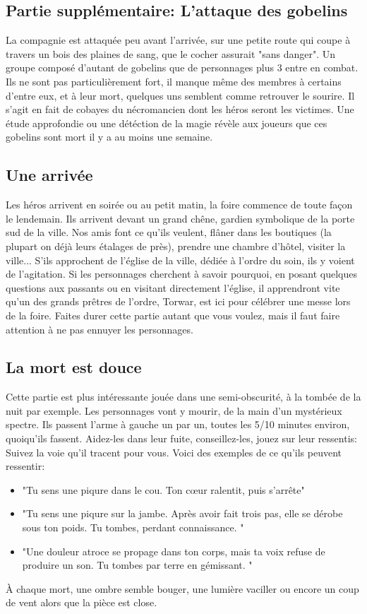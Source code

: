 \documentclass[a4paper]{article}
\begin{document}
\subsection{Partie supplémentaire: L'attaque des gobelins} 
La compagnie est attaquée peu avant l'arrivée, sur une petite route qui coupe à travers un bois des plaines de sang, que le cocher assurait "sans danger". Un groupe composé d'autant de gobelins que de personnages plus 3 entre en combat. Ils ne sont pas particulièrement fort, il manque même des membres à certains d'entre eux, et à leur mort, quelques uns semblent comme retrouver le sourire. Il s'agit en fait de cobayes du nécromancien dont les héros seront les victimes. Une étude approfondie ou une détéction de la magie révèle aux joueurs que ces gobelins sont mort il y a au moins une semaine.

\subsection{Une arrivée}
Les héros arrivent en soirée ou au petit matin, la foire commence de toute façon le lendemain. Ils arrivent devant un grand chêne, gardien symbolique de la porte sud de la ville. Nos amis font ce qu'ils veulent, flâner dans les boutiques (la plupart on déjà leurs étalages de près), prendre une chambre d'hôtel, visiter la ville... S'ils approchent de l'église de la ville, dédiée à l'ordre du soin, ils y voient de l'agitation. Si les personnages cherchent à savoir pourquoi, en posant quelques questions aux passants ou en visitant directement l'église, il apprendront vite qu'un des grands prêtres de l'ordre, Torwar, est ici pour célébrer une messe lors de la foire. Faites durer cette partie autant que vous voulez, mais il faut faire attention à ne pas ennuyer les personnages.

\subsection{La mort est douce}
Cette partie est plus intéressante jouée dans une semi-obscurité, à la tombée de la nuit par exemple. Les personnages vont y mourir, de la main d'un mystérieux spectre. Ils passent l'arme à gauche un par un, toutes les 5/10 minutes environ, quoiqu'ils fassent. Aidez-les dans leur fuite, conseillez-les, jouez sur leur ressentis: Suivez la voie qu'il tracent pour vous. Voici des exemples de ce qu'ils peuvent ressentir:
\begin{itemize}
\item "Tu sens une piqure dans le cou. Ton cœur ralentit, puis s’arrête"
\item  "Tu sens une piqure sur la jambe. Après avoir fait trois pas, elle se dérobe sous ton poids. Tu tombes, perdant connaissance. "
\item  "Une douleur atroce se propage dans ton corps, mais ta voix refuse de produire un son. Tu tombes par terre en gémissant. "
\end{itemize}
À chaque mort, une ombre semble bouger, une lumière vaciller ou encore un coup de vent alors que la pièce est close.
\end{document}
